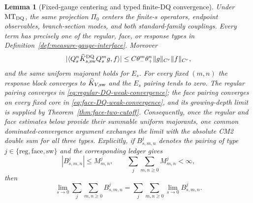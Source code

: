 \documentclass[11pt]{article}
\newtheorem{lemma}[theorem]{Lemma}
\begin{document}
\begin{lemma}[Fixed-gauge centering and typed finite-DQ convergence]
\label{lem:fixed-gauge-centering}
Under $\mathrm{MT}_{\rm DQ}$, the same projection $\Pi_0$ centers the
finite-$s$ operators, endpoint observables, branch-section modes, and both
standard-family couplings.  Every term has precisely one of the regular,
face, or response types in
Definition~\ref{def:measure-gauge-interface}.  Moreover
\begin{equation}
\label{eq:derived-strong-weak-CM2}
 |\langle Q_s^n\widehat K_{s,\rm sw}^{\rm DQ}Q_s^mg,f\rangle|
 \le C\theta_-^m\theta_+^n\|g\|_{C^r}\|f\|_{C^r},
\end{equation}
and the same uniform majorant holds for $E_s$.  For every fixed $(m,n)$ the
response block converges to $\widehat K_{V,\rm sw}$ and the $E_s$ pairing
tends to zero.  The regular pairing converges in
\eqref{eq:regular-DQ-weak-convergence}; the face pairing converges on every
fixed core in \eqref{eq:face-DQ-weak-convergence}, and its growing-depth
limit is supplied by Theorem~\ref{thm:face-two-cutoff}.  Consequently, once the
regular and face estimates below provide their summable uniform majorants,
one common dominated-convergence argument exchanges the limit with the
absolute CM2 double sum for all three types.  Explicitly, if
$B_{s,m,n}^{j}$ denotes the pairing of type
$j\in\{\mathrm{reg},\mathrm{face},\mathrm{sw}\}$ and the corresponding
ledger gives
\begin{equation}
\label{eq:typed-common-dominated-convergence}
 |B_{s,m,n}^{j}|\le M_{m,n}^{j},\qquad
 \sum_{j}\sum_{m,n\ge0}M_{m,n}^{j}<\infty,
\end{equation}
then
\[
 \lim_{s\to0}\sum_j\sum_{m,n\ge0}B_{s,m,n}^{j}
 =\sum_j\sum_{m,n\ge0}\lim_{s\to0}B_{s,m,n}^{j}.
\]
\end{lemma}
\end{document}
